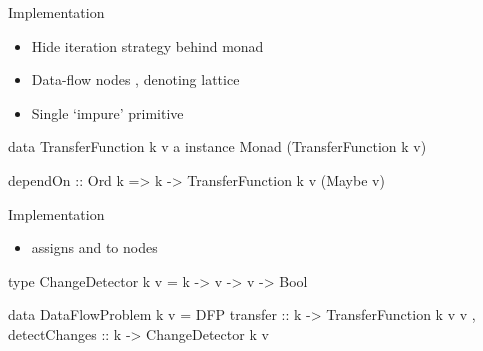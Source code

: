 \documentclass{haskellbeamer}
\begin{document}
\begin{frame}[fragile]{Implementation}
  \begin{itemize}
    \item Hide iteration strategy behind  monad
    \item Data-flow nodes , denoting lattice 
    \item Single `impure' primitive 
  \end{itemize}
  \begin{center}
    \begin{minipage}{0.9\textwidth}
      \begin{haskell}
        data TransferFunction k v a
        instance Monad (TransferFunction k v)

        dependOn
          :: Ord k
          => k
          -> TransferFunction k v (Maybe v)
      \end{haskell}
    \end{minipage}
  \end{center}
\end{frame}

\begin{frame}[fragile]{Implementation}
  \begin{itemize}
    \item {} assigns  and  to nodes
  \end{itemize}
  \begin{center}
    \begin{minipage}{0.9\textwidth}
      \begin{haskell}
        type ChangeDetector k v
          = k -> v -> v -> Bool

        data DataFlowProblem k v 
          = DFP 
          { transfer      :: k -> TransferFunction k v v
          , detectChanges :: k -> ChangeDetector k v
          }
      \end{haskell}
    \end{minipage}
  \end{center}
\end{frame}
\end{document}
